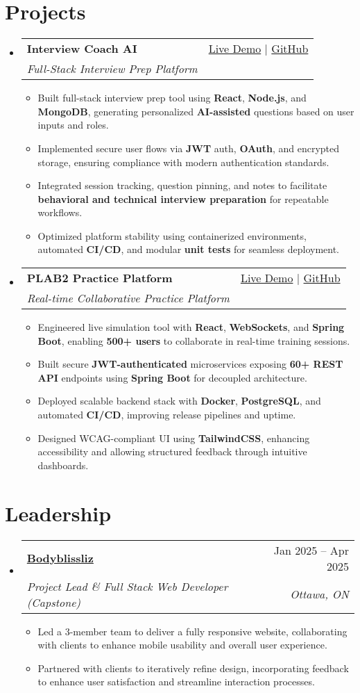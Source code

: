 \documentclass[letterpaper,11pt]{article}
\makeatletter
\newcommand{\resumeItem}[1]{\item\small{#1 \vspace{-2pt}}}
\newcommand{\resumeSubheading}[4]{
  \vspace{-1pt}\item
    \begin{tabular*}{0.97\textwidth}[t]{l@{\extracolsep{\fill}}r}
      \textbf{#1} & #2 \\
      \textit{\small#3} & \textit{\small #4} \\
    \end{tabular*}\vspace{-5pt}
}
\newcommand{\resumeSubHeadingListStart}{\begin{itemize}[leftmargin=*]}
\newcommand{\resumeSubHeadingListEnd}{\end{itemize}}
\newcommand{\resumeItemListStart}{\begin{itemize}}
\newcommand{\resumeItemListEnd}{\end{itemize}\vspace{-5pt}}
\makeatother
\begin{document}
\section{Projects}
  \resumeSubHeadingListStart
    \resumeSubheading
      {\textbf{Interview Coach AI}}{\href{https://interviewcoach-ai.vercel.app}{Live Demo} | \href{https://github.com/altansaid/interviewcoach-ai}{GitHub}}
      {Full-Stack Interview Prep Platform}{}
      \resumeItemListStart
        \resumeItem{Built full-stack interview prep tool using \textbf{React}, \textbf{Node.js}, and \textbf{MongoDB}, generating personalized \textbf{AI-assisted} questions based on user inputs and roles.}
        \resumeItem{Implemented secure user flows via \textbf{JWT} auth, \textbf{OAuth}, and encrypted storage, ensuring compliance with modern authentication standards.}
        \resumeItem{Integrated session tracking, question pinning, and notes to facilitate \textbf{behavioral and technical interview preparation} for repeatable workflows.}
        \resumeItem{Optimized platform stability using containerized environments, automated \textbf{CI/CD}, and modular \textbf{unit tests} for seamless deployment.}
      \resumeItemListEnd

    \resumeSubheading
      {\textbf{PLAB2 Practice Platform}}{\href{https://plab2practice.com}{Live Demo} | \href{https://github.com/altansaid/plab2projectnew}{GitHub}}
      {Real-time Collaborative Practice Platform}{}
      \resumeItemListStart
        \resumeItem{Engineered live simulation tool with \textbf{React}, \textbf{WebSockets}, and \textbf{Spring Boot}, enabling \textbf{500+ users} to collaborate in real-time training sessions.}
        \resumeItem{Built secure \textbf{JWT-authenticated} microservices exposing \textbf{60+ REST API} endpoints using \textbf{Spring Boot} for decoupled architecture.}
        \resumeItem{Deployed scalable backend stack with \textbf{Docker}, \textbf{PostgreSQL}, and automated \textbf{CI/CD}, improving release pipelines and uptime.}
        \resumeItem{Designed WCAG-compliant UI using \textbf{TailwindCSS}, enhancing accessibility and allowing structured feedback through intuitive dashboards.}
      \resumeItemListEnd
  \resumeSubHeadingListEnd

\section{Leadership}
  \resumeSubHeadingListStart
    \resumeSubheading
      {\href{https://www.bodyblissliz.com}{Bodyblissliz}}{Jan 2025 -- Apr 2025}
      {Project Lead \& Full Stack Web Developer (Capstone)}{Ottawa, ON}
      \resumeItemListStart
        \resumeItem{Led a 3-member team to deliver a fully responsive website, collaborating with clients to enhance mobile usability and overall user experience.}
        \resumeItem{Partnered with clients to iteratively refine design, incorporating feedback to enhance user satisfaction and streamline interaction processes.}
      \resumeItemListEnd
  \resumeSubHeadingListEnd
\end{document}
